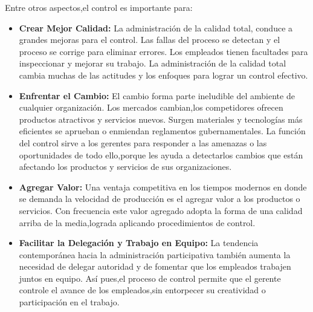 \documentclass[12pt,letterpaper]{article}
\begin{document}
Entre otros aspectos,el control es importante para:
\begin{itemize}
\item \textbf{Crear Mejor Calidad:}  La administración de la calidad total,
conduce a grandes mejoras para el control. Las fallas del proceso se
detectan y el proceso se corrige para eliminar errores. Los empleados
tienen facultades para inspeccionar y mejorar su trabajo. La
administración de la calidad total cambia muchas de las actitudes y
los enfoques para lograr un control efectivo.
\item \textbf{Enfrentar el Cambio:}  El cambio forma parte ineludible del
ambiente de cualquier organización. Los mercados cambian,los
competidores ofrecen productos atractivos y servicios nuevos.
Surgen materiales y tecnologías más eficientes se aprueban o
enmiendan reglamentos gubernamentales. La función del control
sirve a los gerentes para responder a las amenazas o las
oportunidades de todo ello,porque les ayuda a detectarlos cambios
que están afectando los productos y servicios de sus organizaciones.
\item \textbf{Agregar Valor:}  Una ventaja competitiva en los tiempos modernos
en donde se demanda la velocidad de producción es el agregar valor
a los productos o servicios. Con frecuencia este valor agregado
adopta la forma de una calidad arriba de la media,lograda aplicando
procedimientos de control.
\item \textbf{Facilitar la Delegación y Trabajo en Equipo:} La tendencia
contemporánea hacia la administración participativa también
aumenta la necesidad de delegar autoridad y de fomentar que los
empleados trabajen juntos en equipo. Así pues,el proceso de control
permite que el gerente controle el avance de los empleados,sin
entorpecer su creatividad o participación en el trabajo.
\end{itemize}
\end{document}
